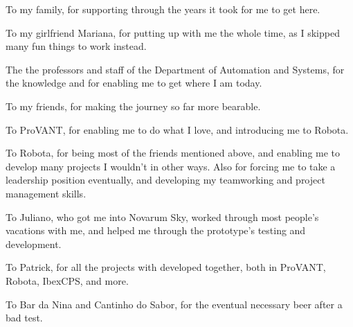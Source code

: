 \begin{agradecimentos}

To my family, for supporting through the years it took for me to get here.

To my girlfriend Mariana, for putting up with me the whole time, as I skipped many fun things to work instead.

The the professors and staff of the Department of Automation and Systems, for the knowledge and for enabling me to get where I am today.

To my friends, for making the journey so far more bearable.

To ProVANT, for enabling me to do what I love, and introducing me to Robota. 

To Robota, for being most of the friends mentioned above, and enabling me to develop many projects I wouldn't in other ways. Also for forcing me to take a leadership position eventually, and developing my teamworking and project management skills.

To Juliano, who got me into Novarum Sky, worked through most people's vacations with me, and helped me through the prototype's testing and development.

To Patrick, for all the projects with developed together, both in ProVANT, Robota, IbexCPS, and more.

To Bar da Nina and Cantinho do Sabor, for the eventual necessary beer after a bad test.



\end{agradecimentos}
